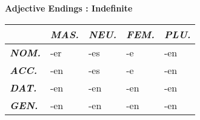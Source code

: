 \documentclass[a4paper,twocolumn,10pt]{article}
\newcommand{\tabularxtable}[3]
{

	\vspace{0.5cm}
	\nolinenumbers

	\begin{tabularx}{#1}{#2}
		#3
	\end{tabularx}

	\linenumbers
	\vspace{0.5cm}
}
\begin{document}
\textbf {Adjective Endings : Indefinite}
\tabularxtable
{0.99\linewidth}
{l|XXXX}
{

&
\cellcolor{table-subtopic} \textbf{\textit{MAS.}} &
\cellcolor{table-subtopic} \textbf{\textit{NEU.}}  &
\cellcolor{table-subtopic} \textbf{\textit{FEM.}}  &
\cellcolor{table-subtopic} \textbf{\textit{PLU.}} \\
\midrule

\cellcolor{table-subtopic} \textbf{\textit{NOM.}} &
\cellcolor{cell-lightgreen}   -er             &
\cellcolor{cell-lightorange} -es             &
\cellcolor{cell-lightred}    -e              &
\cellcolor{cell-lightblue}   -en \\

\cellcolor{table-subtopic} \textbf{\textit{ACC.}} &
\cellcolor{cell-lightblue}   -en             &
\cellcolor{cell-lightorange} -es             &
\cellcolor{cell-lightred}    -e              &
\cellcolor{cell-lightblue}   -en \\

\cellcolor{table-subtopic} \textbf{\textit{DAT.}} &
\cellcolor{cell-lightblue} -en               &
\cellcolor{cell-lightblue} -en               &
\cellcolor{cell-lightblue} -en               &
\cellcolor{cell-lightblue} -en \\

\cellcolor{table-subtopic} \textbf{\textit{GEN.}} &
\cellcolor{cell-lightblue} -en               &
\cellcolor{cell-lightblue} -en               &
\cellcolor{cell-lightblue} -en               &
\cellcolor{cell-lightblue} -en \\




}


\end{document}
